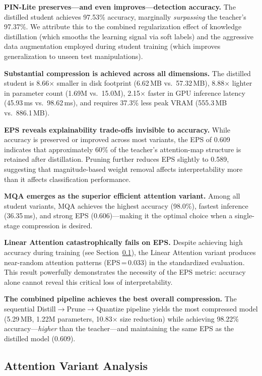 \documentclass[lettersize,journal]{IEEEtran}
\begin{document}
\textbf{PIN-Lite preserves---and even improves---detection accuracy.} The distilled student achieves 97.53\% accuracy, marginally \emph{surpassing} the teacher's 97.37\%. We attribute this to the combined regularization effect of knowledge distillation (which smooths the learning signal via soft labels) and the aggressive data augmentation employed during student training (which improves generalization to unseen test manipulations).

\textbf{Substantial compression is achieved across all dimensions.} The distilled student is 8.66$\times$ smaller in disk footprint (6.62\,MB vs.\ 57.32\,MB), 8.88$\times$ lighter in parameter count (1.69M vs.\ 15.0M), 2.15$\times$ faster in GPU inference latency (45.93\,ms vs.\ 98.62\,ms), and requires 37.3\% less peak VRAM (555.3\,MB vs.\ 886.1\,MB).

\textbf{EPS reveals explainability trade-offs invisible to accuracy.} While accuracy is preserved or improved across most variants, the EPS of 0.609 indicates that approximately 60\% of the teacher's attention-map structure is retained after distillation. Pruning further reduces EPS slightly to 0.589, suggesting that magnitude-based weight removal affects interpretability more than it affects classification performance.

\textbf{MQA emerges as the superior efficient attention variant.} Among all student variants, MQA achieves the highest accuracy (98.0\%), fastest inference (36.35\,ms), and strong EPS (0.606)---making it the optimal choice when a single-stage compression is desired.

\textbf{Linear Attention catastrophically fails on EPS.} Despite achieving high accuracy during training (see Section~\ref{sec:attn_analysis}), the Linear Attention variant produces near-random attention patterns (EPS\,=\,0.033) in the standardized evaluation. This result powerfully demonstrates the necessity of the EPS metric: accuracy alone cannot reveal this critical loss of interpretability.

\textbf{The combined pipeline achieves the best overall compression.} The sequential Distill$\rightarrow$Prune$\rightarrow$Quantize pipeline yields the most compressed model (5.29\,MB, 1.22M parameters, 10.83$\times$ size reduction) while achieving 98.22\% accuracy---\emph{higher} than the teacher---and maintaining the same EPS as the distilled model (0.609).


\subsection{Attention Variant Analysis}
\label{sec:attn_analysis}
\end{document}

